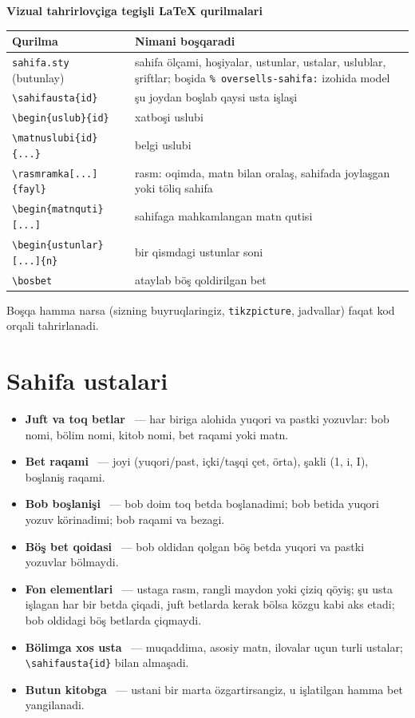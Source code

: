 \textbf{Vizual tahrirlovçiga tegişli LaTeX qurilmalari}
\begin{center}\footnotesize
\begin{tabularx}{\linewidth}{>{\raggedright\arraybackslash}p{50mm}X}
\toprule
Qurilma & Nimani boşqaradi\\
\midrule
\texttt{sahifa.sty} (butunlay) & sahifa ölçami, hoşiyalar, ustunlar, ustalar, uslublar, şriftlar; boşida \texttt{\% oversells-sahifa:} izohida model\\
\texttt{\textbackslash sahifausta\{id\}} & şu joydan boşlab qaysi usta işlaşi\\
\texttt{\textbackslash begin\{uslub\}\{id\}} & xatboşi uslubi\\
\texttt{\textbackslash matnuslubi\{id\}\{...\}} & belgi uslubi\\
\texttt{\textbackslash rasmramka[...]\{fayl\}} & rasm: oqimda, matn bilan oralaş, sahifada joylaşgan yoki töliq sahifa\\
\texttt{\textbackslash begin\{matnquti\}[...]} & sahifaga mahkamlangan matn qutisi\\
\texttt{\textbackslash begin\{ustunlar\}[...]\{n\}} & bir qismdagi ustunlar soni\\
\texttt{\textbackslash bosbet} & ataylab böş qoldirilgan bet\\
\bottomrule
\end{tabularx}
\end{center}
Boşqa hamma narsa (sizning buyruqlaringiz, \texttt{tikzpicture}, jadvallar) faqat kod orqali tahrirlanadi.

\section{Sahifa ustalari}\label{sec:sd-usta}
\begin{itemize}
\item \textbf{Juft va toq betlar} \beta\ --- har biriga alohida yuqori va pastki yozuvlar: bob nomi, bölim nomi, kitob nomi, bet raqami yoki matn.
\item \textbf{Bet raqami} \beta\ --- joyi (yuqori/past, içki/taşqi çet, örta), şakli (1, i, I), boşlaniş raqami.
\item \textbf{Bob boşlanişi} \beta\ --- bob doim toq betda boşlanadimi; bob betida yuqori yozuv körinadimi; bob raqami va bezagi.
\item \textbf{Böş bet qoidasi} \beta\ --- bob oldidan qolgan böş betda yuqori va pastki yozuvlar bölmaydi.
\item \textbf{Fon elementlari} \beta\ --- ustaga rasm, rangli maydon yoki çiziq qöyiş; şu usta işlagan har bir betda çiqadi, juft betlarda kerak bölsa közgu kabi aks etadi; bob oldidagi böş betlarda çiqmaydi.
\item \textbf{Bölimga xos usta} \beta\ --- muqaddima, asosiy matn, ilovalar uçun turli ustalar; \texttt{\textbackslash sahifausta\{id\}} bilan almaşadi.
\item \textbf{Butun kitobga} \beta\ --- ustani bir marta özgartirsangiz, u işlatilgan hamma bet yangilanadi.
\end{itemize}

